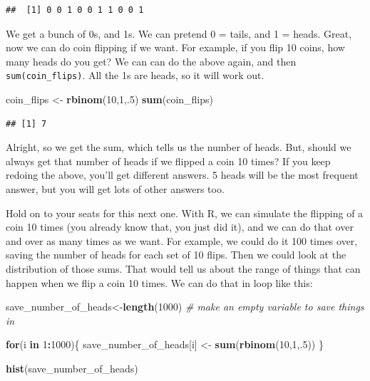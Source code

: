 \documentclass[]{book}
\newenvironment{Shaded}{\begin{snugshade}}{\end{snugshade}}
\newcommand{\KeywordTok}[1]{\textcolor[rgb]{0.13,0.29,0.53}{\textbf{#1}}}
\newcommand{\DecValTok}[1]{\textcolor[rgb]{0.00,0.00,0.81}{#1}}
\newcommand{\StringTok}[1]{\textcolor[rgb]{0.31,0.60,0.02}{#1}}
\newcommand{\CommentTok}[1]{\textcolor[rgb]{0.56,0.35,0.01}{\textit{#1}}}
\newcommand{\ControlFlowTok}[1]{\textcolor[rgb]{0.13,0.29,0.53}{\textbf{#1}}}
\newcommand{\OperatorTok}[1]{\textcolor[rgb]{0.81,0.36,0.00}{\textbf{#1}}}
\newcommand{\NormalTok}[1]{#1}
\begin{document}
\begin{verbatim}
##  [1] 0 0 1 0 0 1 1 0 0 1
\end{verbatim}

We get a bunch of 0s, and 1s. We can pretend 0 = tails, and 1 = heads.
Great, now we can do coin flipping if we want. For example, if you flip
10 coins, how many heads do you get? We can can do the above again, and
then \texttt{sum(coin\_flips)}. All the 1s are heads, so it will work
out.

\begin{Shaded}
\begin{Highlighting}[]
\NormalTok{coin_flips <-}\StringTok{ }\KeywordTok{rbinom}\NormalTok{(}\DecValTok{10}\NormalTok{,}\DecValTok{1}\NormalTok{,.}\DecValTok{5}\NormalTok{)}
\KeywordTok{sum}\NormalTok{(coin_flips)}
\end{Highlighting}
\end{Shaded}

\begin{verbatim}
## [1] 7
\end{verbatim}

Alright, so we get the sum, which tells us the number of heads. But,
should we always get that number of heads if we flipped a coin 10 times?
If you keep redoing the above, you'll get different answers. 5 heads
will be the most frequent answer, but you will get lots of other answers
too.

Hold on to your seats for this next one. With R, we can simulate the
flipping of a coin 10 times (you already know that, you just did it),
and we can do that over and over as many times as we want. For example,
we could do it 100 times over, saving the number of heads for each set
of 10 flips. Then we could look at the distribution of those sums. That
would tell us about the range of things that can happen when we flip a
coin 10 times. We can do that in loop like this:

\begin{Shaded}
\begin{Highlighting}[]
\NormalTok{save_number_of_heads<-}\KeywordTok{length}\NormalTok{(}\DecValTok{1000}\NormalTok{) }\CommentTok{# make an empty variable to save things in}

\ControlFlowTok{for}\NormalTok{(i }\ControlFlowTok{in} \DecValTok{1}\OperatorTok{:}\DecValTok{1000}\NormalTok{)\{}
\NormalTok{  save_number_of_heads[i] <-}\StringTok{ }\KeywordTok{sum}\NormalTok{(}\KeywordTok{rbinom}\NormalTok{(}\DecValTok{10}\NormalTok{,}\DecValTok{1}\NormalTok{,.}\DecValTok{5}\NormalTok{))}
\NormalTok{\}}

\KeywordTok{hist}\NormalTok{(save_number_of_heads)}
\end{Highlighting}
\end{Shaded}
\end{document}
